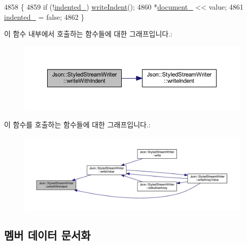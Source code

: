 \begin{DoxyCode}
4858                                                                     \{
4859   \textcolor{keywordflow}{if} (!\hyperlink{class_json_1_1_styled_stream_writer_aa12db1753619a9b48da41f3e45e3275d}{indented\_}) \hyperlink{class_json_1_1_styled_stream_writer_a5a52fa5b406f1580a61dde3b5638e76d}{writeIndent}();
4860   *\hyperlink{class_json_1_1_styled_stream_writer_aa8c4e4576f5c3dcb10955d133a092dd6}{document\_} << value;
4861   \hyperlink{class_json_1_1_styled_stream_writer_aa12db1753619a9b48da41f3e45e3275d}{indented\_} = \textcolor{keyword}{false};
4862 \}
\end{DoxyCode}
이 함수 내부에서 호출하는 함수들에 대한 그래프입니다.\+:\nopagebreak
\begin{figure}[H]
\begin{center}
\leavevmode
\includegraphics[width=350pt]{class_json_1_1_styled_stream_writer_a4e64789373b359c9b7a7244509b918fc_cgraph}
\end{center}
\end{figure}
이 함수를 호출하는 함수들에 대한 그래프입니다.\+:\nopagebreak
\begin{figure}[H]
\begin{center}
\leavevmode
\includegraphics[width=350pt]{class_json_1_1_styled_stream_writer_a4e64789373b359c9b7a7244509b918fc_icgraph}
\end{center}
\end{figure}


\subsection{멤버 데이터 문서화}
\mbox{\label{class_json_1_1_styled_stream_writer_a4e4bb7fc223b2652b72b523b1ce414fa}} 
